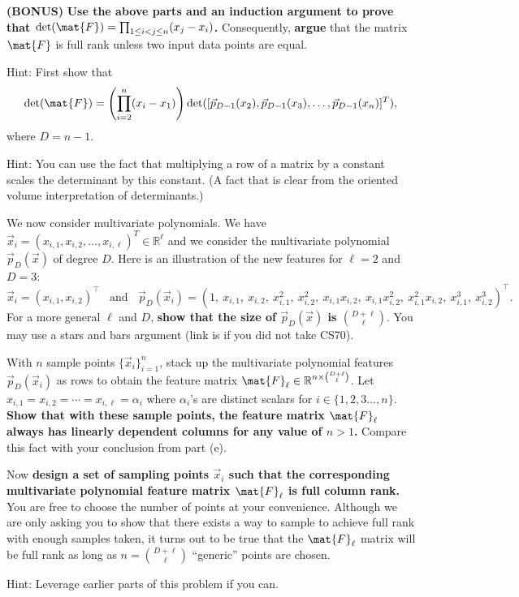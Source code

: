 \documentclass[preview]{standalone}
\begin{document}
\begin{Parts}
\Part \textbf{(BONUS)} {\bf Use the above parts and an induction argument to prove that $\det(\mat{F}) = \prod_{1 \leq i < j \leq n} (x_j - x_i)$.}
Consequently, {\bf argue} that the matrix $\mat{F}$ is full rank unless two input data points are equal.

Hint: First show that
\begin{align*}
\det(\mat{F}) = \left( \prod_{i = 2}^n (x_i - x_1) \right) \det( [\vec{p}_{D-1}(x_2),\vec{p}_{D-1}(x_3),\ldots,\vec{p}_{D-1}(x_n)]^T),
\end{align*}
where $D = n-1$.

Hint: You can use the fact that multiplying a row of a matrix by a constant scales the determinant by this constant. (A fact that is clear from the oriented volume interpretation of determinants.)



\Part We now consider multivariate polynomials. We have
$\vec{x}_i = (x_{i,1}, x_{i,2}, \ldots , x_{i,\ell})^T \in \mathbb{R}^\ell$ and we consider the multivariate polynomial $\vec{p}_D(\vec{x})$ of degree $D$.
Here is an illustration of the new features for $\ell=2$ and $D=3$:
$$
\vec{x}_i = (x_{i,1}, x_{i,2})^\top \ \ \ \ \text{and} \ \ \ \
\vec{p}_D(\vec{x}_i) = (1,\ x_{i, 1},\ x_{i, 2},\ x_{i, 1}^2,\ x_{i, 2}^2,\ x_{i, 1}x_{i,2},\ x_{i, 1}x_{i,2}^2,\ x_{i, 1}^2x_{i, 2},\ x_{i, 1}^3,\ x_{i, 2}^3)^\top.$$
\newcommand{\MYhref}[3][blue]{\href{#2}{\color{#1}{#3}}}
For a more general $\ell$ and $D$, {\bf show that the size of $\vec{p}_D(\vec{x})$ is $\binom{D + \ell}{\ell}$}.
You may use a stars and bars argument (link is \href{https://inst.eecs.berkeley.edu/~cs70/fa15/slides/lec-18.6up.pdf}{\color{brown}{here}} if you did not take CS70).



\Part With $n$ sample points $\{\vec{x}_i\}_{i=1}^n$, stack up the multivariate polynomial features $\vec{p}_D(\vec{x}_i)$ as rows to obtain the feature matrix $\mat{F}_{\ell} \in \mathbb{R}^{n \times \binom{D + \ell}{\ell}}$.
Let $x_{i,1} = x_{i,2} = \cdots  = x_{i,\ell} = \alpha_i$ where $\alpha_i$'s are distinct scalars for $i \in \{1, 2, 3 \ldots, n\}$.
{\bf Show that with these sample points, the feature matrix $\mat{F}_{\ell}$ always has linearly dependent columns for any value of $n > 1$.}
Compare this fact with your conclusion from part (e).



\Part Now {\bf design a set of sampling points $\vec{x}_i$ such that the corresponding multivariate polynomial feature matrix $\mat{F}_{\ell}$ is full column rank.} You are free to choose the number of points at your convenience.
Although we are only asking you to show that there exists a way to sample to achieve full rank with enough samples taken, it turns out to be true that the $\mat{F}_{\ell}$ matrix will be full rank as long as $n=\binom{D + \ell}{\ell}$ ``generic'' points are chosen.

Hint: Leverage earlier parts of this problem if you can.






\end{Parts}
\end{document}
